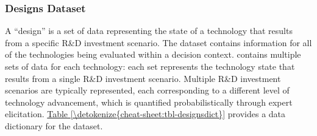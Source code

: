 \documentclass[letterpaper,10pt,english]{sphinxmanual}
\begin{document}
\subsubsection{Designs Dataset}
\label{\detokenize{cheat-sheet:designs-dataset}}
\sphinxAtStartPar
A “design” is a set of data representing the state of a technology that results from a specific R\&D investment scenario. The  dataset contains information for all of the technologies being evaluated within a decision context.  contains multiple sets of data for each technology: each set represents the technology state that results from a single R\&D investment scenario.  Multiple R\&D investment scenarios are typically represented, each corresponding to a different level of technology advancement, which is quantified probabilistically through expert elicitation. \hyperref[\detokenize{cheat-sheet:tbl-designsdict}]{Table \ref{\detokenize{cheat-sheet:tbl-designsdict}}} provides a data dictionary for the  dataset.
\end{document}
